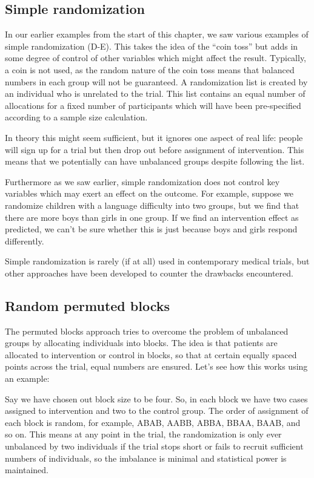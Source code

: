 \documentclass{krantz}
\begin{document}
\hypertarget{simple-randomization}{%
\subsection{Simple randomization}\label{simple-randomization}}

In our earlier examples from the start of this chapter, we saw various examples of simple randomization (D-E). This takes the idea of the ``coin toss'' but adds in some degree of control of other variables which might affect the result. Typically, a coin is not used, as the random nature of the coin toss means that balanced numbers in each group will not be guaranteed. A randomization list is created by an individual who is unrelated to the trial. This list contains an equal number of allocations for a fixed number of participants which will have been pre-specified according to a sample size calculation.

In theory this might seem sufficient, but it ignores one aspect of real life: people will sign up for a trial but then drop out before assignment of intervention. This means that we potentially can have unbalanced groups despite following the list.

Furthermore as we saw earlier, simple randomization does not control key variables which may exert an effect on the outcome. For example, suppose we randomize children with a language difficulty into two groups, but we find that there are more boys than girls in one group. If we find an intervention effect as predicted, we can't be sure whether this is just because boys and girls respond differently.

Simple randomization is rarely (if at all) used in contemporary medical trials, but other approaches have been developed to counter the drawbacks encountered.

\hypertarget{random-permuted-blocks}{%
\subsection{Random permuted blocks}\label{random-permuted-blocks}}

The permuted blocks approach tries to overcome the problem of unbalanced groups by allocating individuals into blocks. The idea is that patients are allocated to intervention or control in blocks, so that at certain equally spaced points across the trial, equal numbers are ensured. Let's see how this works using an example:

Say we have chosen out block size to be four. So, in each block we have two cases assigned to intervention and two to the control group. The order of assignment of each block is random, for example, ABAB, AABB, ABBA, BBAA, BAAB, and so on. This means at any point in the trial, the randomization is only ever unbalanced by two individuals if the trial stops short or fails to recruit sufficient numbers of individuals, so the imbalance is minimal and statistical power is maintained.
\end{document}
